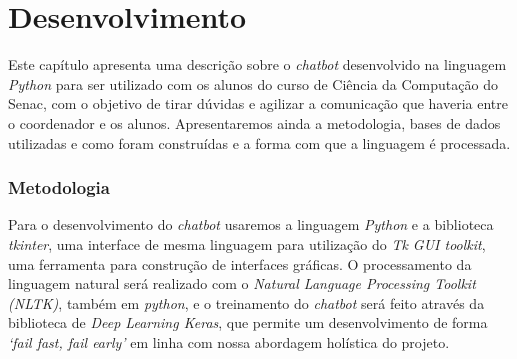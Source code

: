 \documentclass[
	12pt,				%
	oneside,
	a4paper,			%
	english,			%
	french,				%
	spanish,			%
	brazil				%
	]{abntex2}
\begin{document}

\part{Desenvolvimento}

Este capítulo apresenta uma descrição sobre o \emph{chatbot} desenvolvido na linguagem \emph{Python} para ser utilizado com os alunos do curso de Ciência da Computação do Senac, com o objetivo de tirar dúvidas e agilizar a comunicação que haveria entre o coordenador e os alunos.
Apresentaremos ainda a metodologia, bases de dados utilizadas e como foram construídas e a forma com que a linguagem é processada.


\section{Metodologia}

Para o desenvolvimento do \emph{chatbot} usaremos a linguagem \emph{Python} e a biblioteca \emph{tkinter}, uma interface de mesma linguagem para utilização do \emph{Tk GUI toolkit}, uma ferramenta para construção de interfaces gráficas. O processamento da linguagem natural será realizado com o \emph{Natural Language Processing Toolkit (NLTK)}, também em \emph{python}, e o treinamento do \emph{chatbot} será feito através da biblioteca de \emph{Deep Learning Keras}, que permite um desenvolvimento de forma \emph{‘fail fast, fail early’} em linha com nossa abordagem holística do projeto.
\end{document}
